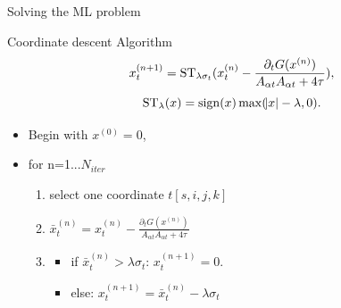\documentclass[10pt]{beamer}
\begin{document}
\begin{frame}{Solving the ML problem}
\begin{alertblock}{Coordinate descent Algorithm}
\begin{equation}\notag
x^{(n+1)}_{t}=\mathrm{ST}_{\lambda\sigma_{t}} (x^{(n)}_{t} -\frac{\partial_t G(x^{(n)})}{A_{\alpha t}A_{\alpha t}+4\tau}),
\end{equation}
\begin{equation}\notag
\mathrm{ST}_{\lambda} (x) = \mathrm{sign} (x) \max (\abs{x}-\lambda,0).
\end{equation}
\end{alertblock}

\begin{itemize}
\item Begin with $x^{(0)}=0$,
 \item for n=1...$N_{iter}$
    \begin{enumerate}
     \item select one coordinate $t [s,i,j,k]$
     \item $ \bar{x}_t^{(n)}=x^{(n)}_{t} -\frac{\partial_t G(x^{(n)})}{A_{\alpha t}A_{\alpha t}+4\tau}$
     \item \begin{itemize}
            \item if $ \bar{x}_t^{(n)}>\lambda \sigma_t$: $x_t^{(n+1)}=0.$
            \item else: $x_t^{(n+1)}= \bar{x}_t^{(n)}-\lambda\sigma_t$
           \end{itemize}

    \end{enumerate}

\end{itemize}
\end{frame}
\end{document}
